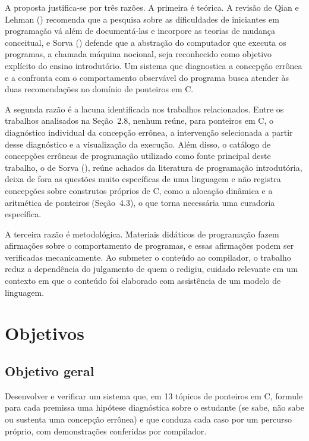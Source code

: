 A proposta justifica-se por três razões. A primeira é teórica. A revisão de Qian e Lehman (\citeyear{qian2017}) recomenda que a pesquisa sobre as dificuldades de iniciantes em programação vá além de documentá-las e incorpore as teorias de mudança conceitual, e Sorva (\citeyear{sorva2013}) defende que a abstração do computador que executa os programas, a chamada máquina nocional, seja reconhecido como objetivo explícito do ensino introdutório. Um sistema que diagnostica a concepção errônea e a confronta com o comportamento observável do programa busca atender às duas recomendações no domínio de ponteiros em C.

A segunda razão é a lacuna identificada nos trabalhos relacionados. Entre os trabalhos analisados na Seção~2.8, nenhum reúne, para ponteiros em C, o diagnóstico individual da concepção errônea, a intervenção selecionada a partir desse diagnóstico e a visualização da execução. Além disso, o catálogo de concepções errôneas de programação utilizado como fonte principal deste trabalho, o de Sorva (\citeyear{sorva2012}), reúne achados da literatura de programação introdutória, deixa de fora as questões muito específicas de uma linguagem e não registra concepções sobre construtos próprios de C, como a alocação dinâmica e a aritmética de ponteiros (Seção~4.3), o que torna necessária uma curadoria específica.

A terceira razão é metodológica. Materiais didáticos de programação fazem afirmações sobre o comportamento de programas, e essas afirmações podem ser verificadas mecanicamente. Ao submeter o conteúdo ao compilador, o trabalho reduz a dependência do julgamento de quem o redigiu, cuidado relevante em um contexto em que o conteúdo foi elaborado com assistência de um modelo de linguagem.

\section{Objetivos}

\subsection{Objetivo geral}

Desenvolver e verificar um sistema que, em 13 tópicos de ponteiros em C, formule para cada premissa uma hipótese diagnóstica sobre o estudante (se sabe, não sabe ou sustenta uma concepção errônea) e que conduza cada caso por um percurso próprio, com demonstrações conferidas por compilador.

